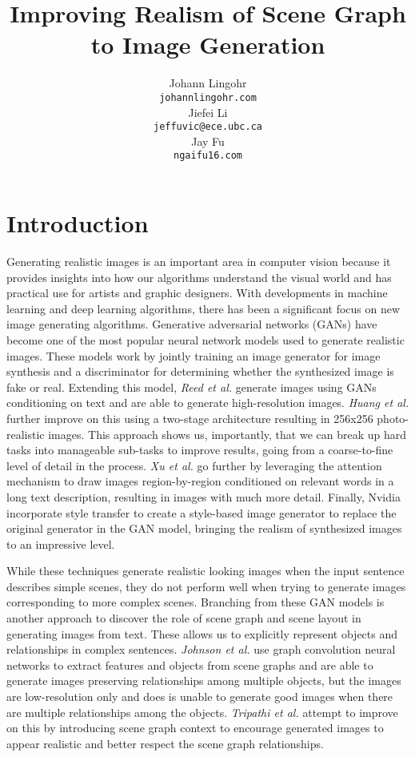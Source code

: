 \documentclass{article}
\title{Improving Realism of Scene Graph to Image Generation}
\author{%
  Johann Lingohr \\
  \texttt{johannlingohr\@gmail.com} \\
  \And
  Jiefei Li \\
  \texttt{jeffuvic@ece.ubc.ca} \\
  \And
  Jay Fu \\
  \texttt{ngaifu16\@gmail.com} \\
}
\begin{document}

\maketitle

\section{Introduction}

Generating realistic images is an important area in computer vision because it provides insights into how our algorithms understand the visual world and has practical use for artists and graphic designers. With developments in machine learning and deep learning algorithms, there has been a significant focus on new image generating algorithms. Generative adversarial networks (GANs) \cite{gan} have become one of the most popular neural network models used to generate realistic images. These models work by jointly training an image generator for image synthesis and a discriminator for determining whether the synthesized image is fake or real. Extending this model, \textit{Reed et al.} \cite{t2im} generate images using GANs conditioning on text and are able to generate high-resolution images. \textit{Huang et al.} \cite{stackedgan} further improve on this using a two-stage architecture resulting in 256x256 photo-realistic images. This approach shows us, importantly, that we can break up hard tasks into manageable sub-tasks to improve results, going from a coarse-to-fine level of detail in the process. \textit{Xu et al.} \cite{attengan} go further by leveraging the attention mechanism to draw images region-by-region conditioned on relevant words in a long text description, resulting in images with much more detail. Finally, Nvidia \cite{stylegan} incorporate style transfer to create a style-based image generator to replace the original generator in the GAN model, bringing the realism of synthesized images to an impressive level.

While these techniques generate realistic looking images when the input sentence describes simple scenes, they do not perform well when trying to generate images corresponding to more complex scenes. Branching from these GAN models is another approach to discover the role of scene graph and scene layout in generating images from text. These allows us to explicitly represent objects and relationships in complex sentences. \textit{Johnson et al.} \cite{sg2im} use graph convolution neural networks to extract features and objects from scene graphs and are able to generate images preserving relationships among multiple objects, but the images are low-resolution only and does is unable to generate good images when there are multiple relationships among the objects. \textit{Tripathi et al.} \cite{sg2imgcontext} attempt to improve on this by introducing scene graph context to encourage generated images to appear realistic and better respect the scene graph relationships.
\end{document}
